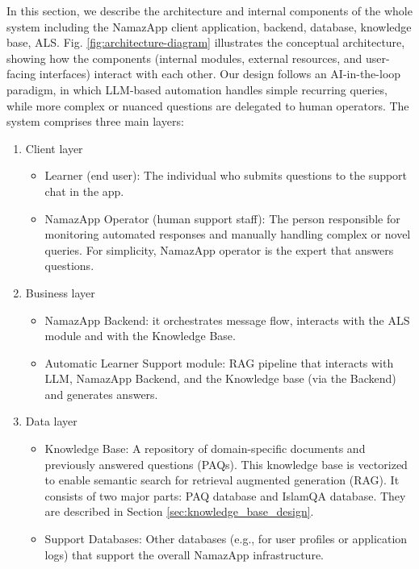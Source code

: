 In this section, we describe the architecture and internal components of the whole system including the NamazApp client application, backend, database, knowledge base, ALS. Fig. \ref{fig:architecture-diagram} illustrates the conceptual architecture, showing how the components (internal modules, external resources, and user-facing interfaces) interact with each other. Our design follows an AI-in-the-loop paradigm, in which LLM-based automation handles simple recurring queries, while more complex or nuanced questions are delegated to human operators. 
The system comprises three main layers:
\begin{enumerate}
    \item Client layer
    \begin{itemize}
        \item Learner (end user): The individual who submits questions to the support chat in the app.
        \item NamazApp Operator (human support staff): The person responsible for monitoring automated responses and manually handling complex or novel queries. For simplicity, NamazApp operator is the expert that answers questions.
    \end{itemize}
    \item Business layer
    \begin{itemize}
        \item NamazApp Backend: it orchestrates message flow, interacts with the ALS module and with the Knowledge Base. 
        \item Automatic Learner Support module: RAG pipeline that interacts with LLM, NamazApp Backend, and the Knowledge base (via the Backend) and generates answers.
    \end{itemize}
    \item Data layer
    \begin{itemize}
        \item Knowledge Base: A repository of domain-specific documents and previously answered questions (PAQs). This knowledge base is vectorized to enable semantic search for retrieval augmented generation (RAG). It consists of two major parts: PAQ database and IslamQA database. They are described in Section \ref{sec:knowledge_base_design}.
        \item Support Databases: Other databases (e.g., for user profiles or application logs) that support the overall NamazApp infrastructure.
    \end{itemize}
\end{enumerate}

